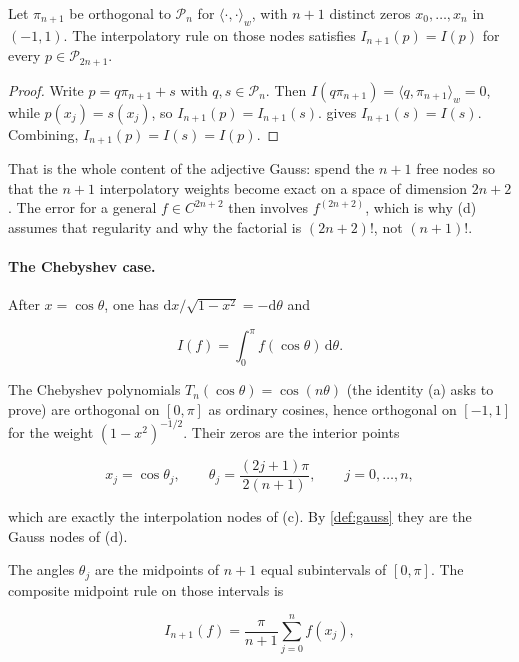 \begin{lemma}[Precision \(2n+1\)]
\label{lem:gauss-prec-cheb}
Let \(\pi_{n+1}\) be orthogonal to \(\mathcal{P}_{n}\) for \(\langle\cdot,\cdot\rangle_{w}\), with \(n+1\) distinct zeros \(x_{0},\ldots,x_{n}\) in \((-1,1)\). The interpolatory rule on those nodes satisfies \(I_{n+1}(p)=I(p)\) for every \(p\in\mathcal{P}_{2n+1}\).
\end{lemma}

\begin{proof}
Write \(p=q\pi_{n+1}+s\) with \(q,s\in\mathcal{P}_{n}\). Then \(I(q\pi_{n+1})=\langle q,\pi_{n+1}\rangle_{w}=0\), while \(p(x_{j})=s(x_{j})\), so \(I_{n+1}(p)=I_{n+1}(s)\).  gives \(I_{n+1}(s)=I(s)\). Combining, \(I_{n+1}(p)=I(s)=I(p)\).
\end{proof}

That is the whole content of the adjective Gauss: spend the \(n+1\) free nodes so that the \(n+1\) interpolatory weights become exact on a space of dimension \(2n+2\). The error for a general \(f\in C^{2n+2}\) then involves \(f^{(2n+2)}\), which is why (d) assumes that regularity and why the factorial is \((2n+2)!\), not \((n+1)!\).

\paragraph{The Chebyshev case.}

After \(x=\cos\theta\), one has \(\mathrm{d}x/\sqrt{1-x^{2}}=-\mathrm{d}\theta\) and

\[
I(f)
=
\int_{0}^{\pi} f(\cos\theta)\,\mathrm{d}\theta.
\]

The Chebyshev polynomials \(T_{n}(\cos\theta)=\cos(n\theta)\) (the identity (a) asks to prove) are orthogonal on \([0,\pi]\) as ordinary cosines, hence orthogonal on \([-1,1]\) for the weight \((1-x^{2})^{-1/2}\). Their zeros are the interior points

\begin{equation}
\label{eq:cheb-nodes}
x_{j}
=
\cos\theta_{j},
\qquad
\theta_{j}
=
\frac{(2j+1)\pi}{2(n+1)},
\qquad
j=0,\ldots,n,
\end{equation}

which are exactly the interpolation nodes of (c). By \cref{def:gauss} they are the Gauss nodes of (d).

The angles \(\theta_{j}\) are the midpoints of \(n+1\) equal subintervals of \([0,\pi]\). The composite midpoint rule on those intervals is

\begin{equation}
\label{eq:gauss-cheb}
I_{n+1}(f)
=
\frac{\pi}{n+1}
\sum_{j=0}^{n} f(x_{j}),
\end{equation}

